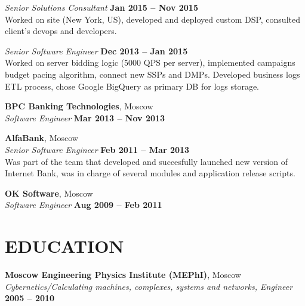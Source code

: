 \documentclass[margin,line]{resume}
\begin{document}
\begin{resume}
    \textsl{Senior Solutions Consultant} \vspace{2mm}\hfill \textbf{Jan 2015 – Nov 2015}\\
    Worked on site (New York, US), developed and deployed custom DSP, consulted client's devops and developers. \vspace{1mm}

    \textsl{Senior Software Engineer} \vspace{2mm}\hfill \textbf{Dec 2013 – Jan 2015}\\
   Worked on server bidding logic (5000 QPS per server), implemented campaigns budget pacing algorithm, connect new SSPs and DMPs. Developed business logs ETL process, chose Google BigQuery as primary DB for logs storage.

    \textbf{\listing BPC Banking Technologies}, Moscow \vspace{2mm}\\\vspace{1mm}%
    \textsl{Software Engineer} \hfill \textbf{Mar 2013 – Nov 2013}

    \textbf{\listing AlfaBank}, Moscow \vspace{2mm}\\\vspace{1mm}%
    \textsl{Senior Software Engineer} \hfill \textbf{Feb 2011 – Mar 2013}\\
    Was part of the team that developed and succesfully launched new version of Internet Bank, was in charge of several modules and application release scripts.

    \textbf{\listing OK Software}, Moscow \vspace{2mm}\\\vspace{1mm}%
    \textsl{Software Engineer} \hfill \textbf{Aug 2009 -- Feb 2011}
    

\sectionline

    \section{\mysidestyle \textbf{\large{E}\small{DUCATION}}}

    \textbf{\listing Moscow Engineering Physics Institute (MEPhI)}, Moscow \vspace{2mm}\\\vspace{1mm}%
    \textsl{Cybernetics/Calculating machines, complexes, systems and networks, Engineer} \hfill \textbf{2005 -- 2010}\vspace{-3mm}\\\vspace{-1mm}%
    \vspace{-1.5mm}



\end{resume}
\end{document}
